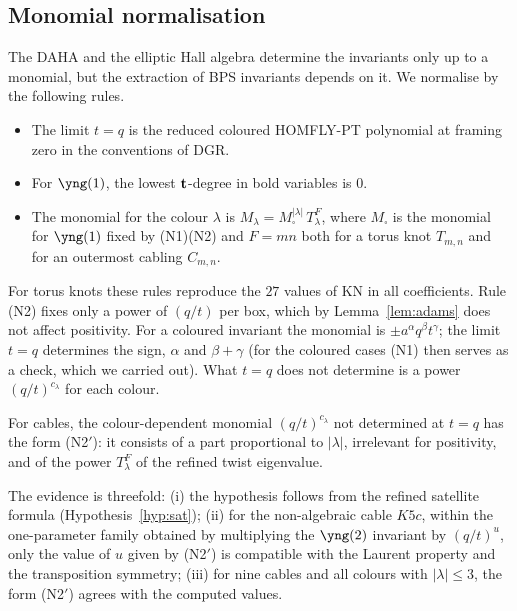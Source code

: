 \subsection{Monomial normalisation}\label{sec:normalization}
The DAHA and the elliptic Hall algebra determine the invariants only up to a monomial, but the extraction of BPS invariants depends on it. We normalise by the following rules.
\begin{itemize} %
\item[(N1)] The limit $t=q$ is the reduced coloured HOMFLY-PT polynomial at framing zero in the conventions of DGR.
\item[(N2)] For $\yng(1)$, the lowest $\mathbf{t}$-degree in bold variables is $0$.
\item[(N2$'$)] The monomial for the colour $\lambda$ is $M_\lambda=M_\square^{|\lambda|}\,T_\lambda^{F}$, where $M_\square$ is the monomial for $\yng(1)$ fixed by (N1)(N2)
and $F=mn$ both for a torus knot $T_{m,n}$ and for an outermost cabling $C_{m,n}$.
\end{itemize}
For torus knots these rules reproduce the $27$ values of KN in all coefficients.
Rule (N2) fixes only a power of $(q/t)$ per box, which by Lemma~\ref{lem:adams} does not affect positivity.
For a coloured invariant the monomial is $\pm a^\alpha q^\beta t^\gamma$; the limit $t=q$ determines the sign, $\alpha$ and $\beta+\gamma$ (for the coloured cases (N1) then serves as a check, which we carried out).
What $t=q$ does not determine is a power $(q/t)^{c_\lambda}$ for each colour.

\begin{hypothesis}\label{hyp:N2}
For cables, the colour-dependent monomial $(q/t)^{c_\lambda}$ not determined at $t=q$ has the form {\rm(N2$'$)}:
it consists of a part proportional to $|\lambda|$, irrelevant for positivity, and of the power $T_\lambda^F$ of the refined twist eigenvalue.
\end{hypothesis}
The evidence is threefold:
(i) the hypothesis follows from the refined satellite formula (Hypothesis~\ref{hyp:sat});
(ii) for the non-algebraic cable $K5c$, within the one-parameter family obtained by multiplying the $\yng(2)$ invariant by $(q/t)^u$, only the value of $u$ given by (N2$'$) is compatible with the Laurent property and the transposition symmetry;
(iii) for nine cables and all colours with $|\lambda|\le3$, the form (N2$'$) agrees with the computed values.

